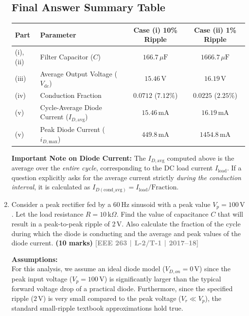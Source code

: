 \documentclass[12pt,a3paper]{article}
\newcommand{\yr}[1]{\hfill\textcolor{gray}{\small\textbf{[#1]}}}
\newcommand{\mk}[1]{\textcolor{orange!70!black}{\small\textbf{(#1 marks)}}}
\begin{document}
\begin{enumerate}
\begin{tcolorbox}[enhanced,breakable,ansbox,colback=cA!4,colframe=cA,boxrule=0.8pt,arc=5pt,title={\textbf{Answer}},fonttitle=\bfseries\color{white},colbacktitle=cA]
\subsection*{Final Answer Summary Table}
\begin{center}
\renewcommand{\arraystretch}{1.4}
\begin{tabular}{@{}llcc@{}}
\toprule
\textbf{Part} & \textbf{Parameter} & \textbf{Case (i) 10\% Ripple} & \textbf{Case (ii) 1\% Ripple} \\ \midrule
(i), (ii) & Filter Capacitor ($C$) & $166.7\,\mu\text{F}$ & $1666.7\,\mu\text{F}$ \\ 
(iii) & Average Output Voltage ($V_{\text{dc}}$) & $15.46\,\text{V}$ & $16.19\,\text{V}$ \\ 
(iv) & Conduction Fraction & $0.0712$ ($7.12\%$) & $0.0225$ ($2.25\%$) \\ 
(v) & Cycle-Average Diode Current ($I_{D,\text{avg}}$) & $15.46\,\text{mA}$ & $16.19\,\text{mA}$ \\ 
(v) & Peak Diode Current ($i_{D,\text{max}}$) & $449.8\,\text{mA}$ & $1454.8\,\text{mA}$ \\ 
\bottomrule
\end{tabular}
\end{center}

\textbf{Important Note on Diode Current:} 
The $I_{D,\text{avg}}$ computed above is the average over the \textit{entire cycle}, corresponding to the DC load current $I_{\text{load}}$. If a question explicitly asks for the average current strictly \textit{during the conduction interval}, it is calculated as $I_{D(\text{cond\_avg})} = I_{\text{load}} / \text{Fraction}$.

\end{tcolorbox}

\item Consider a peak rectifier fed by a 60\,Hz sinusoid with a peak value $V_p=100\,\text{V}$. Let the load resistance $R=10\,\text{k}\Omega$. Find the value of capacitance $C$ that will result in a peak-to-peak ripple of 2\,V. Also calculate the fraction of the cycle during which the diode is conducting and the average and peak values of the diode current.
\mk{10} \yr{EEE 263 | L-2/T-1 | 2017--18}

\begin{tcolorbox}[enhanced,breakable,ansbox,colback=cA!4,colframe=cA,boxrule=0.8pt,arc=5pt,title={\textbf{Answer}},fonttitle=\bfseries\color{white},colbacktitle=cA]

\textbf{Assumptions:} \\
For this analysis, we assume an ideal diode model ($V_{D,on} = 0\,\text{V}$) since the peak input voltage ($V_p = 100\,\text{V}$) is significantly larger than the typical forward voltage drop of a practical diode. Furthermore, since the specified ripple ($2\,\text{V}$) is very small compared to the peak voltage ($V_r \ll V_p$), the standard small-ripple textbook approximations hold true.


\end{tcolorbox}
\end{enumerate}
\end{document}
